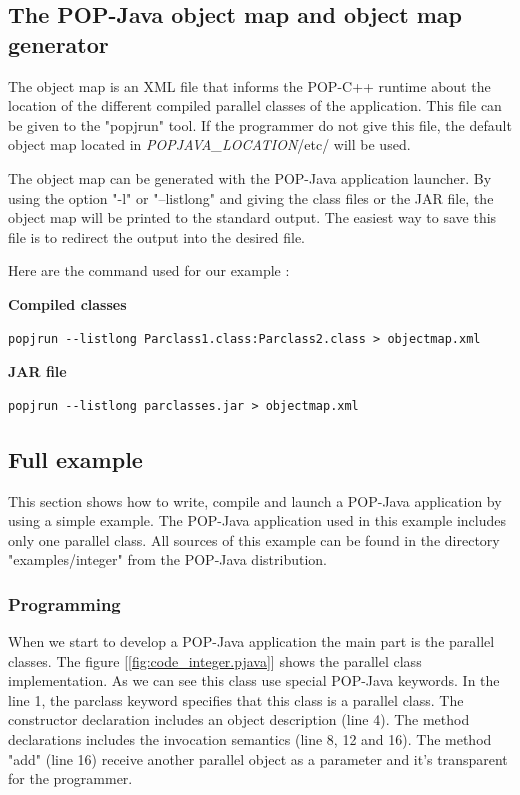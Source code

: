 \subsection{The POP-Java object map and object map generator}
\label{objectmap}
The object map is an XML file that informs the POP-C++ runtime about the location of the different compiled parallel classes of the application. This file can be given to the "popjrun" tool. If the programmer do not give this file, the default object map located in \textit{POPJAVA\_LOCATION}/etc/ will be used. \s

The object map can be generated with the POP-Java application launcher. By using the option "-l" or "--listlong" and giving the class files or the JAR file, the object map will be printed to the standard output. The easiest way to save this file is to redirect the output into the desired file.\s

Here are the command used for our example : \s

\textbf{Compiled classes}
\begin{lstlisting}
popjrun --listlong Parclass1.class:Parclass2.class > objectmap.xml
\end{lstlisting}\s

\textbf{JAR file}
\begin{lstlisting}
popjrun --listlong parclasses.jar > objectmap.xml
\end{lstlisting}

\pagebreak
\subsection{Full example}
This section shows how to write, compile and launch a POP-Java application by using a simple example. The POP-Java application used in this example includes only one parallel class. All sources of this example can be found in the directory "examples/integer" from the POP-Java distribution.

\subsubsection{Programming}
When we start to develop a POP-Java application the main part is the parallel classes. The figure [\ref{fig:code_integer.pjava}] shows the parallel class implementation. As we can see this class use special POP-Java keywords. In the line 1, the parclass keyword specifies that this class is a parallel class. The constructor declaration includes an object description (line 4). The method declarations includes the invocation semantics (line 8, 12 and 16). The method "add" (line 16) receive another parallel object as a parameter and it's transparent for the programmer.

